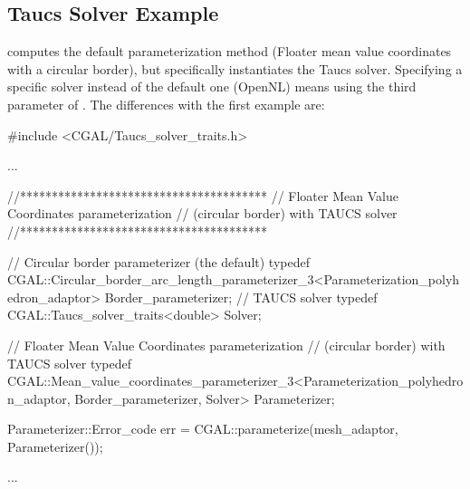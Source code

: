 \subsection{{\sc Taucs} Solver Example}

 computes the
default parameterization method (Floater mean value coordinates with a circular border),
but specifically instantiates the {\sc Taucs} solver. Specifying a specific solver
instead of the default one (OpenNL) means using the third parameter of
.  The differences with the first
example  are:

\begin{ccExampleCode}

#include <CGAL/Taucs_solver_traits.h>

...

//***************************************
// Floater Mean Value Coordinates parameterization
// (circular border) with TAUCS solver
//***************************************

// Circular border parameterizer (the default)
typedef CGAL::Circular_border_arc_length_parameterizer_3<Parameterization_polyhedron_adaptor>
                                                    Border_parameterizer;
// TAUCS solver
typedef CGAL::Taucs_solver_traits<double>           Solver;

// Floater Mean Value Coordinates parameterization
// (circular border) with TAUCS solver
typedef CGAL::Mean_value_coordinates_parameterizer_3<Parameterization_polyhedron_adaptor,
                                                        Border_parameterizer,
                                                        Solver>
                                                    Parameterizer;

Parameterizer::Error_code err = CGAL::parameterize(mesh_adaptor, Parameterizer());

...

\end{ccExampleCode}

